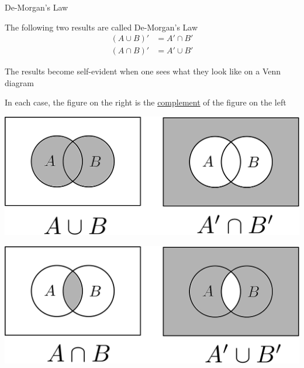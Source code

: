 \documentclass[14pt,fleqn]{extarticle}
\begin{document}
 
\begin{skill}
    \begin{narrow}
    
         De-Morgan's Law 
    \end{narrow}
    
    \reason 
    
    The following two results are called De-Morgan's Law
    \begin{align}
	\left(A\cup B \right)' &= A'\cap B' \\
	\left(A\cap B \right)' &= A'\cup B' 
\end{align}
    
    The results become self-evident when one sees what they look like on a Venn diagram\newline 
    
    In each case, the figure on the right is the \underline{complement} of the figure 
    on the left
    
    \begin{center}
\includegraphics[scale=0.35]{96-A.svg}
\end{center}

\begin{center}
\includegraphics[scale=0.35]{96-B.svg}
\end{center}
\end{skill}
\end{document}
